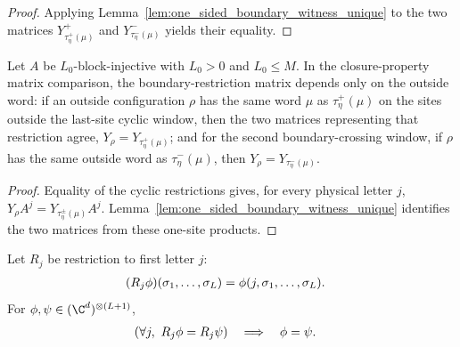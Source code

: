 \begin{proof}
    \leanok
    Applying Lemma~\ref{lem:one_sided_boundary_witness_unique} to the two
    matrices $Y^+_{\tau^+_\eta(\mu)}$ and $Y^-_{\tau^-_\eta(\mu)}$ yields their
    equality.
\end{proof}

\begin{lemma}
    \label{lem:outside_labels_determine_boundary_witnesses}
    \leanok
    Let $A$ be $L_0$-block-injective with $L_0>0$ and $L_0\le M$. In the
    closure-property matrix comparison, the boundary-restriction matrix depends
    only on the outside word: if an outside configuration $\rho$ has the same
    word $\mu$ as $\tau^+_\eta(\mu)$ on the sites outside the last-site cyclic
    window, then the two matrices representing that restriction agree,
    $Y_\rho = Y_{\tau^+_\eta(\mu)}$; and for the second boundary-crossing
    window, if $\rho$ has the same outside word as $\tau^-_\eta(\mu)$, then
    $Y_\rho = Y_{\tau^-_\eta(\mu)}$.
\end{lemma}

\begin{proof}
    \leanok
    Equality of the cyclic restrictions gives, for every physical letter $j$,
    $Y_\rho A^j = Y_{\tau^\pm_\eta(\mu)}A^j$.
    Lemma~\ref{lem:one_sided_boundary_witness_unique} identifies the two
    matrices from these one-site products.
\end{proof}

\begin{lemma}
    \label{lem:first_letter_restrictions_determine}
    \leanok
    Let $R_j$ be restriction to first letter $j$:
    \begin{align}
        (R_j\phi)(\sigma_1,\ldots,\sigma_L)
         & = \phi(j,\sigma_1,\ldots,\sigma_L).
        \notag
    \end{align}
    For $\phi,\psi\in(\C^d)^{\otimes(L+1)}$,
    \begin{align}
        (\forall j,\ R_j\phi=R_j\psi)
         & \quad\Longrightarrow\quad \phi=\psi.
        \notag
    \end{align}
\end{lemma}

